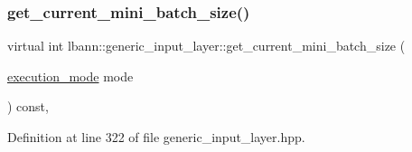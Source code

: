 \subsubsection{\texorpdfstring{get\+\_\+current\+\_\+mini\+\_\+batch\+\_\+size()}{get\_current\_mini\_batch\_size()}\hspace{0.1cm}{\footnotesize\ttfamily [1/2]}}
{\footnotesize\ttfamily virtual int lbann\+::generic\+\_\+input\+\_\+layer\+::get\+\_\+current\+\_\+mini\+\_\+batch\+\_\+size (\begin{DoxyParamCaption}\item[{\hyperlink{base_8hpp_a2781a159088df64ed7d47cc91c4dc0a8}{execution\+\_\+mode}}]{mode }\end{DoxyParamCaption}) const\hspace{0.3cm}{\ttfamily [inline]}, {\ttfamily [virtual]}}



Definition at line 322 of file generic\+\_\+input\+\_\+layer.\+hpp.


